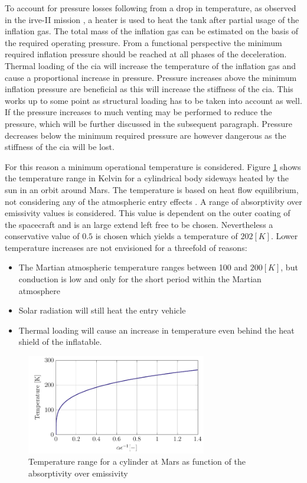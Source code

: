 To account for pressure losses following from a drop in temperature, as observed in the \gls{irve}-II mission \cite{Dillman2012}, a heater is used to heat the tank after partial usage of the inflation gas. The total mass of the inflation gas can be estimated on the basis of the required operating pressure. From a functional perspective the minimum required inflation pressure should be reached at all phases of the deceleration. Thermal loading of the \gls{cia} will increase the temperature of the inflation gas and cause a proportional increase in pressure. Pressure increases above the minimum inflation pressure are beneficial as this will increase the stiffness of the \gls{cia}. This works up to some point as structural loading has to be taken into account as well. If the pressure increases to much venting may be performed to reduce the pressure, which will be further discussed in the subsequent paragraph. Pressure decreases below the minimum required pressure are however dangerous as the stiffness of the \gls{cia} will be lost.

For this reason a minimum operational temperature is considered. Figure \ref{fig:tanktemp} shows the temperature range in Kelvin for a cylindrical body sideways heated by the sun in an orbit around Mars. The temperature is based on heat flow equilibrium, not considering any of the atmospheric entry effects \cite{Wertz2011}. A range of absorptivity over emissivity values is considered. This value is dependent on the outer coating of the spacecraft and is an large extend left free to be chosen. Nevertheless a conservative value of $0.5$ is chosen which yields a temperature of $202 \left[K\right]$. Lower temperature increases are not envisioned for a threefold of reasons:

\begin{itemize}
\item The Martian atmospheric temperature ranges between 100 and $200 \left[K\right]$, but conduction is low and only for the short period within the Martian atmosphere
\item Solar radiation will still heat the entry vehicle
\item Thermal loading will cause an increase in temperature even behind the heat shield of the inflatable.
\end{itemize}

\begin{figure}[h]
		\centering
		\includegraphics[width=0.7\textwidth]{./Figure/Structure/Temp.pdf}
		\caption{Temperature range for a cylinder at Mars as function of the absorptivity over emissivity}
		\label{fig:tanktemp}
\end{figure}

